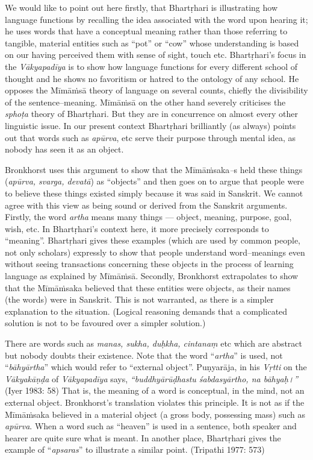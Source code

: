 We would like to point out here firstly, that Bhartṛhari is illustrating how language functions by recalling the idea associated with the word upon hearing it; he uses words that have a conceptual meaning rather than those referring to tangible, material entities such as “pot” or “cow” whose understanding is based on our having perceived them with sense of sight, touch etc. Bhartṛhari’s focus in the \textit{Vākyapadīya} is to show how language functions for every different school of thought and he shows no favoritism or hatred to the ontology of any school. He opposes the Mīmāṁsā theory of language on several counts, chiefly the divisibility of the sentence–meaning. Mīmāṁsā on the other hand severely criticises the \textit{sphoṭa} theory of Bhartṛhari. But they are in concurrence on almost every other linguistic issue. In our present context Bhartṛhari brilliantly (as always) points out that words such as \textit{apūrva}, etc serve their purpose through mental idea, as nobody has seen it as an object.

Bronkhorst uses this argument to show that the Mīmāṁsaka\textit{–}s held these things (\textit{apūrva, svarga, devatā}) as “objects” and then goes on to argue that people were to believe these things existed simply because it was said in Sanskrit. We cannot agree with this view as being sound or derived from the Sanskrit arguments. Firstly, the word \textit{artha} means many things –– object, meaning, purpose, goal, wish, etc. In Bhartṛhari’s context here, it more precisely corresponds to “meaning”. Bhartṛhari gives these examples (which are used by common people, not only scholars) expressly to show that people understand word–meanings even without seeing transactions concerning these objects in the process of learning language as explained by Mīmāṁsā. Secondly, Bronkhorst extrapolates to show that the Mīmāṁsaka believed that these entities were objects, as their names (the words) were in Sanskrit. This is not warranted, as there is a simpler explanation to the situation. (Logical reasoning demands that a complicated solution is not to be favoured over a simpler solution.)

There are words such as \textit{manas, sukha, duḥkha, cintanaṃ} etc which are abstract but nobody doubts their existence. Note that the word “\textit{artha}” is used, not “\textit{bāhyārtha}” which would refer to “external object”. Puṇyarāja, in his \textit{Vṛtti} on the \textit{Vākyakāṇḍa} of \textit{Vākyapadīya} says, \textit{“buddhyārūḍhastu śabdasyārtho, na bāhyaḥ।”} (Iyer 1983: 58) That is, the meaning of a word is conceptual, in the mind, not an external object. Bronkhorst’s translation violates this principle. It is not as if the Mīmāṁsaka believed in a material object (a gross body, possessing mass) such as \textit{apūrva}. When a word such as “heaven” is used in a sentence, both speaker and hearer are quite sure what is meant. In another place, Bhartṛhari gives the example of “\textit{apsaras}” to illustrate a similar point. (Tripathi 1977: 573)

